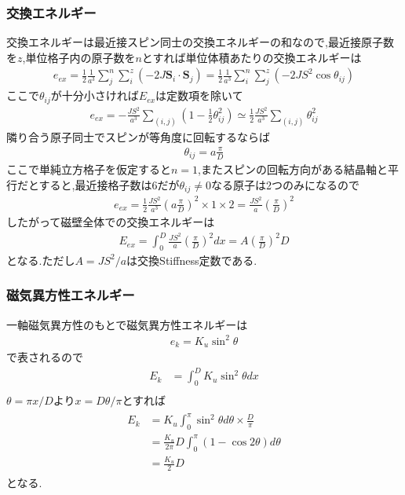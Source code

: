 \documentclass[uplatex,a4j,11pt,dvipdfmx]{jsarticle}
\begin{document}
\subsubsection*{交換エネルギー}
交換エネルギーは最近接スピン同士の交換エネルギーの和なので,最近接原子数を$z$,単位格子内の原子数を$n$とすれば単位体積あたりの交換エネルギーは
\begin{align*}
  e_{ex}=\frac{1}{2}\frac{1}{a^3}\sum_j^n\sum_i^z(-2J{\bm S}_i\cdot{\bm S}_j)=\frac{1}{2}\frac{1}{a^3}\sum_i^n\sum_j^z(-2JS^2\cos\theta_{ij})
\end{align*}
ここで$\theta_{ij}$が十分小さければ$E_{ex}$は定数項を除いて
\begin{align*}
  e_{ex}=-\frac{JS^2}{a^3}\sum_{(i,j)}\left(1-\frac{1}{2}\theta_{ij}^2\right)\simeq\frac{1}{2}\frac{JS^2}{a^3}\sum_{(i,j)}\theta_{ij}^2
\end{align*}
隣り合う原子同士でスピンが等角度に回転するならば
\begin{align*}
  \theta_{ij}=a\frac{\pi}{D}
\end{align*}
ここで単純立方格子を仮定すると$n=1$,またスピンの回転方向がある結晶軸と平行だとすると,最近接格子数は6だが$\theta_{ij}\neq 0$なる原子は2つのみになるので
\begin{align*}
  e_{ex}=\frac{1}{2}\frac{JS^2}{a^3}\left(a\frac{\pi}{D}\right)^2\times1\times2=\frac{JS^2}{a}\left(\frac{\pi}{D}\right)^2
\end{align*}
したがって磁壁全体での交換エネルギーは
\begin{align}
  E_{ex}=\int_0^D\frac{JS^2}{a}\left(\frac{\pi}{D}\right)^2dx=A\left(\frac{\pi}{D}\right)^2D
\end{align}
となる.ただし$A=JS^2/a$は交換Stiffness定数である.
\subsubsection*{磁気異方性エネルギー}
一軸磁気異方性のもとで磁気異方性エネルギーは
\begin{align*}
  e_k=K_u\sin^2\theta
\end{align*}
で表されるので
\begin{align*}
  E_k&=\int_0^DK_u\sin^2\theta dx\\
\end{align*}
$\theta=\pi x/D$より$x=D\theta/\pi$とすれば
\begin{align}
  \begin{split}
    E_k&=K_u\int_0^\pi\sin^2\theta d\theta\times\frac{D}{\pi}\\
    &=\frac{K_u}{2\pi}D\int_0^\pi(1-\cos2\theta)d\theta\\
    &=\frac{K_u}{2}D
  \end{split}
\end{align}
となる.
\end{document}
